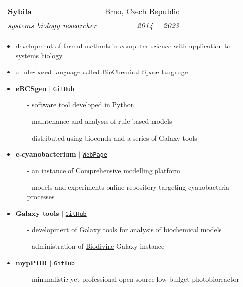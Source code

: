 \documentclass[letterpaper,11pt]{article}
\makeatletter
\newcommand{\resumeSubheading}[4]{
  \vspace{-2pt}\item
    \begin{tabular*}{0.97\textwidth}[t]{l@{\extracolsep{\fill}}r}
      \textbf{#1} & #2 \\
      \textit{\small#3} & \textit{\small #4} \\
    \end{tabular*}\vspace{-7pt}
}
\makeatother
\begin{document}
  \vspace{10pt}
    
  \resumeSubheading
  {\href{https://sybila.fi.muni.cz/}{Sybila}}{Brno, Czech Republic}
  {systems biology researcher}{2014 \textbf{--} 2023}
  \small{
    \begin{itemize}
      \item development of formal methods in computer science with application to systems biology \vspace{-2pt}
      \item a rule-based language called BioChemical Space language \vspace{2pt}
      \item \textbf{eBCSgen} $|$ \href{https://github.com/sybila/eBCSgen}{\color{blue}\texttt{GitHub}} \vspace{-2pt}
      \begin{itemize}
        \item[-] software tool developed in Python \vspace{-2pt}
        \item[-] maintenance and analysis of rule-based models \vspace{-2pt}
        \item[-] distributed using bioconda and a series of Galaxy tools
      \end{itemize}
      \item \textbf{e-cyanobacterium} $|$ \href{https://www.e-cyanobacterium.org/}{\color{blue}\texttt{WebPage}} \vspace{-2pt}
      \begin{itemize}
        \item[-] an instance of Comprehensive modelling platform \vspace{-2pt}
        \item[-] models and experiments online repository targeting cyanobacteria processes \vspace{-2pt}
      \end{itemize}
      \item \textbf{Galaxy tools} $|$ \href{https://github.com/sybila/galaxytools}{\color{blue}\texttt{GitHub}} \vspace{-2pt}
      \begin{itemize}
        \item[-] development of Galaxy tools for analysis of biochemical models \vspace{-2pt}
        \item[-] administration of \href{https://biodivine-vm.fi.muni.cz/galaxy}{Biodivine} Galaxy instance \vspace{-2pt}
      \end{itemize}
      \item \textbf{mypPBR} $|$ \href{https://github.com/xtrojak/bioreactor}{\color{blue}\texttt{GitHub}} \vspace{-2pt}
      \begin{itemize}
        \item[-] minimalistic yet professional open-source low-budget photobioreactor \vspace{-2pt}
      \end{itemize}
    \end{itemize}
  }
\end{document}
